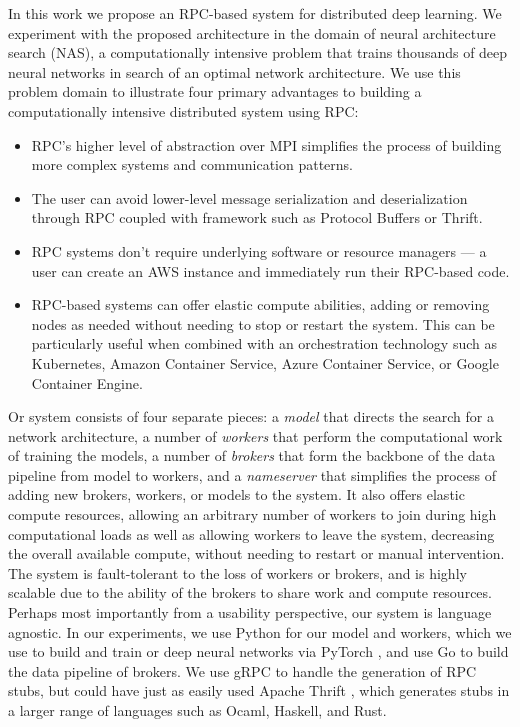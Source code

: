 \documentclass[conference]{IEEEtran}
\begin{document}
In this work we propose an RPC-based system for distributed deep learning. We
experiment with the proposed architecture in the domain of neural architecture
search (NAS), a computationally intensive problem that trains thousands of deep
neural networks in search of an optimal network architecture.  We use this
problem domain to illustrate four primary advantages to building a
computationally intensive distributed system using RPC:
\begin{itemize}
\item RPC's higher level of abstraction over MPI simplifies the process of
  building more complex systems and communication patterns.
\item The user can avoid lower-level message serialization and deserialization
  through RPC coupled with framework such as Protocol Buffers or Thrift.
\item RPC systems don't require underlying software or resource managers --- a
  user can create an AWS instance and immediately run their RPC-based code.
\item RPC-based systems can offer elastic compute abilities, adding or removing
  nodes as needed without needing to stop or restart the system. This can be
  particularly useful when combined with an orchestration technology such as
  Kubernetes, Amazon Container Service, Azure Container Service, or Google
  Container Engine.
\end{itemize}
Or system consists of four separate pieces: a \emph{model} that directs the
search for a network architecture, a number of \emph{workers} that perform the
computational work of training the models, a number of \emph{brokers} that form
the backbone of the data pipeline from model to workers, and a \emph{nameserver}
that simplifies the process of adding new brokers, workers, or models to the
system. It also offers elastic compute resources, allowing an arbitrary number
of workers to join during high computational loads as well as allowing workers
to leave the system, decreasing the overall available compute, without needing
to restart or manual intervention.  The system is fault-tolerant to the loss of
workers or brokers, and is highly scalable due to the ability of the brokers to
share work and compute resources. Perhaps most importantly from a usability
perspective, our system is language agnostic. In our experiments, we use Python
for our model and workers, which we use to build and train or deep neural
networks via PyTorch \cite{paszke2017automatic}, and use Go to build the data
pipeline of brokers. We use gRPC \cite{Wang:1993:GCC:155870.155881} to handle
the generation of RPC stubs, but could have just as easily used Apache Thrift
\cite{Slee2007}, which generates stubs in a larger range of languages such as
Ocaml, Haskell, and Rust.
\end{document}
